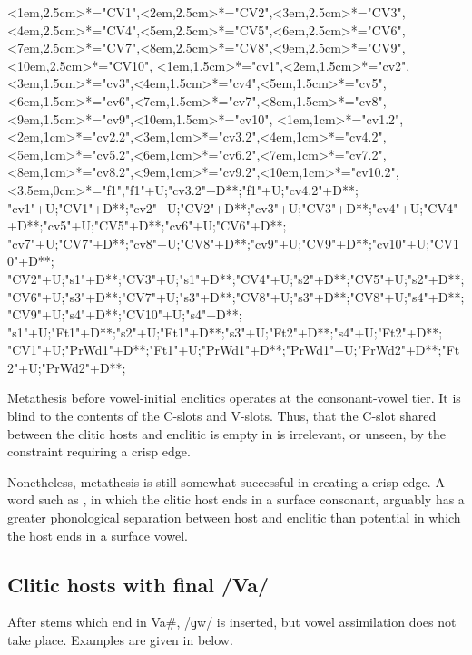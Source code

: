 \begin{multicols}{2}
\begin{exe}
{\begin{xlist}
{		<1em,2.5cm>*="CV1",<2em,2.5cm>*="CV2",<3em,2.5cm>*="CV3",<4em,2.5cm>*="CV4",<5em,2.5cm>*="CV5",<6em,2.5cm>*="CV6",
		<7em,2.5cm>*="CV7",<8em,2.5cm>*="CV8",<9em,2.5cm>*="CV9",<10em,2.5cm>*="CV10",
		<1em,1.5cm>*="cv1",<2em,1.5cm>*="cv2",<3em,1.5cm>*="cv3",<4em,1.5cm>*="cv4",<5em,1.5cm>*="cv5",<6em,1.5cm>*\as{\0}="cv6",<7em,1.5cm>*="cv7",<8em,1.5cm>*\as{ }="cv8",<9em,1.5cm>*="cv9",<10em,1.5cm>*\as{ }="cv10",
		<1em,1cm>*="cv1.2",<2em,1cm>*="cv2.2",<3em,1cm>*="cv3.2",<4em,1cm>*="cv4.2",<5em,1cm>*="cv5.2",<6em,1cm>*\as{\0}="cv6.2",<7em,1cm>*="cv7.2",<8em,1cm>*\as{ }="cv8.2",<9em,1cm>*="cv9.2",<10em,1cm>*\as{ }="cv10.2",
		<3.5em,0cm>*\as{\tsc{[+fr.]}}="f1","f1"+U;"cv3.2"+D**\dir{-};"f1"+U;"cv4.2"+D**\dir{-};
		"cv1"+U;"CV1"+D**\dir{-};"cv2"+U;"CV2"+D**\dir{-};"cv3"+U;"CV3"+D**\dir{-};"cv4"+U;"CV4"+D**\dir{-};"cv5"+U;"CV5"+D**\dir{-};"cv6"+U;"CV6"+D**\dir{-};
		"cv7"+U;"CV7"+D**\dir{-};"cv8"+U;"CV8"+D**\dir{};"cv9"+U;"CV9"+D**\dir{-};"cv10"+U;"CV10"+D**\dir{};
		"CV2"+U;"s1"+D**\dir{-};"CV3"+U;"s1"+D**\dir{-};"CV4"+U;"s2"+D**\dir{-};"CV5"+U;"s2"+D**\dir{-};
		"CV6"+U;"s3"+D**\dir{-};"CV7"+U;"s3"+D**\dir{-};"CV8"+U;"s3"+D**\dir{-};"CV8"+U;"s4"+D**\dir{-};"CV9"+U;"s4"+D**\dir{-};"CV10"+U;"s4"+D**\dir{-};
		"s1"+U;"Ft1"+D**\dir{-};"s2"+U;"Ft1"+D**\dir{-};"s3"+U;"Ft2"+D**\dir{-};"s4"+U;"Ft2"+D**\dir{-};
		"CV1"+U;"PrWd1"+D**\dir{-};"Ft1"+U;"PrWd1"+D**\dir{-};"PrWd1"+U;"PrWd2"+D**\dir{-};"Ft2"+U;"PrWd2"+D**\dir{-};
	\endxy}
	\end{xlist}}
\end{exe}
\end{multicols}

Metathesis before vowel-initial enclitics operates at the consonant-vowel tier.
It is blind to the contents of the C-slots and V-slots.
Thus, that the C-slot shared between the clitic hosts and enclitic is empty
in  is irrelevant, or unseen, by the constraint requiring a crisp edge.

Nonetheless, metathesis is still somewhat successful in creating a crisp edge.
A word such as , in which the clitic host ends in a surface consonant,
arguably has a greater phonological separation between host and enclitic
than potential  in which the host ends in a surface vowel.

\subsection{Clitic hosts with final /Va/}
After stems which end in Va{\#},
/ɡw/ is inserted, but vowel assimilation does not take place.
Examples are given in  below.

